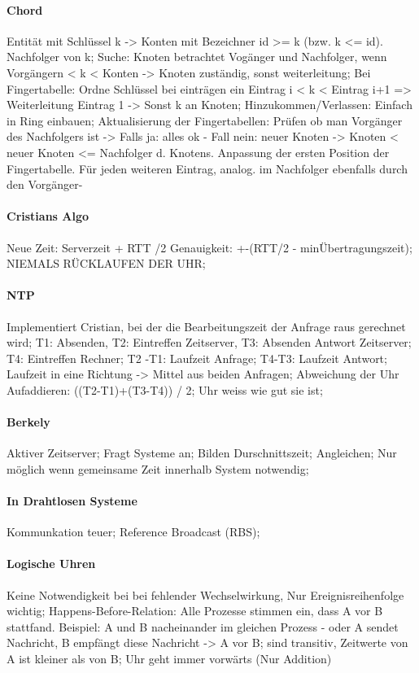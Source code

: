 \documentclass[pagesize,11pt,a4paper]{scrartcl}
\begin{document}
\paragraph{Chord}
	Entität mit Schlüssel k -> Konten mit Bezeichner id >= k (bzw. k <= id). Nachfolger von k;
	Suche: Knoten betrachtet Vogänger und Nachfolger, wenn Vorgängern < k < Konten -> Knoten zuständig, sonst weiterleitung;
	Bei Fingertabelle: Ordne Schlüssel bei einträgen ein Eintrag i < k < Eintrag i+1 => Weiterleitung Eintrag 1 -> Sonst k an Knoten;
	Hinzukommen/Verlassen: Einfach in Ring einbauen; Aktualisierung der Fingertabellen: Prüfen ob man Vorgänger des Nachfolgers ist ->
		Falls ja: alles ok -
		Fall nein: neuer Knoten -> Knoten < neuer Knoten <= Nachfolger d. Knotens. Anpassung der ersten Position der Fingertabelle. Für jeden weiteren Eintrag, analog. im Nachfolger ebenfalls durch den Vorgänger-

\paragraph*{Cristians Algo}
	Neue Zeit: Serverzeit + RTT /2  Genauigkeit: +-(RTT/2 - minÜbertragungszeit);
	NIEMALS RÜCKLAUFEN DER UHR;

\paragraph*{NTP}
	Implementiert Cristian, bei der die Bearbeitungszeit der Anfrage raus gerechnet wird;
	T1: Absenden, T2: Eintreffen Zeitserver, T3: Absenden Antwort Zeitserver; T4: Eintreffen Rechner;
	T2 -T1: Laufzeit Anfrage; T4-T3: Laufzeit Antwort;
	Laufzeit in eine Richtung -> Mittel aus beiden Anfragen;
	Abweichung der Uhr Aufaddieren: ((T2-T1)+(T3-T4)) / 2;
	Uhr weiss wie gut sie ist;

\paragraph*{Berkely}
	Aktiver Zeitserver; Fragt Systeme an; Bilden Durschnittszeit; Angleichen;
	Nur möglich wenn gemeinsame Zeit innerhalb System notwendig;

\paragraph*{In Drahtlosen Systeme}
	Kommunkation teuer; Reference Broadcast (RBS);

\paragraph*{Logische Uhren}
	Keine Notwendigkeit bei bei fehlender Wechselwirkung, Nur Ereignisreihenfolge wichtig;
	Happens-Before-Relation: Alle Prozesse stimmen ein, dass A vor B stattfand.
		Beispiel: A und B nacheinander im gleichen Prozess -
		oder A sendet Nachricht, B empfängt diese Nachricht -> A vor B;
	sind transitiv, Zeitwerte von A ist kleiner als von B;
	Uhr geht immer vorwärts (Nur Addition)
\end{document}
